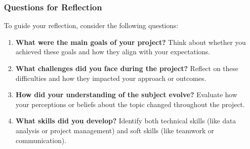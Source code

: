 \documentclass[aspectratio=169]{beamer}
\begin{document}
\begin{frame}[fragile]
    \frametitle{Questions for Reflection}
    To guide your reflection, consider the following questions:
    \begin{enumerate}
        \item \textbf{What were the main goals of your project?}  
            Think about whether you achieved these goals and how they align with your expectations.
        \item \textbf{What challenges did you face during the project?}  
            Reflect on these difficulties and how they impacted your approach or outcomes.
        \item \textbf{How did your understanding of the subject evolve?}  
            Evaluate how your perceptions or beliefs about the topic changed throughout the project.
        \item \textbf{What skills did you develop?}  
            Identify both technical skills (like data analysis or project management) and soft skills (like teamwork or communication).
    \end{enumerate}
\end{frame}
\end{document}
